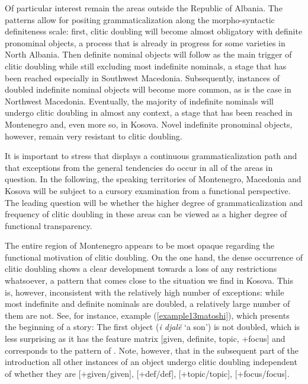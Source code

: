 \documentclass[output=paper]{langsci/langscibook}
\begin{document}
Of particular interest remain the areas outside the Republic of Albania. The patterns allow for positing grammaticalization along the morpho-syntactic definiteness scale: first, clitic doubling will become almost obligatory with definite pronominal objects, a process that is already in progress for some varieties in North Albania. Then definite nominal objects will follow as the main trigger of clitic doubling while still excluding most indefinite nominals, a stage that has been reached especially in Southwest Macedonia. Subsequently, instances of doubled indefinite nominal objects will become more common, as is the case in Northwest Macedonia. Eventually, the majority of indefinite nominals will undergo clitic doubling in almost any context, a stage that has been reached in Montenegro and, even more so, in Kosova. Novel indefinite pronominal objects, however, remain very resistant to clitic doubling. 

It is important to stress that  displays a continuous grammaticalization path and that exceptions from the general tendencies do occur in all of the areas in question. In the following, the  speaking territories of Montenegro, Macedonia and Kosova will be subject to a cursory examination from a functional perspective. The leading question will be whether the higher degree of grammaticalization and frequency of clitic doubling in these areas can be viewed as a higher degree of functional transparency.\largerpage

The entire region of Montenegro appears to be most opaque regarding the functional motivation of clitic doubling. On the one hand, the dense occurrence of clitic doubling shows a clear development towards a loss of any restrictions whatsoever, a pattern that comes close to the situation we find in Kosova. This is, however, inconsistent with the relatively high number of exceptions: while most indefinite and definite nominals are doubled, a relatively large number of them are not. See, for instance, example (\ref{example13matoshi}), which presents the beginning of a story: The first object (\textit{i djalë} ‘a son’) is not doubled, which is less surprising as it has the feature matrix [\textminus{}given, \textminus{}definite, \textminus{}topic, +focus] and corresponds to the pattern of . Note, however, that in the subsequent part of the introduction all other instances of an object undergo clitic doubling independent of whether they are [+given/\textminus{}given], [+def/\textminus{}def], [+topic/\textminus{}topic], [+focus/\textminus{}focus].
\end{document}
